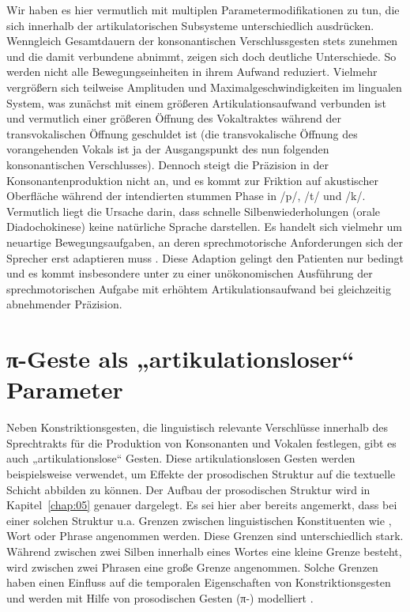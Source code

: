 Wir haben es hier vermutlich mit multiplen Parametermodifikationen zu tun, die sich innerhalb der artikulatorischen Subsysteme unterschiedlich ausdrücken. Wenngleich Gesamtdauern der konsonantischen Verschlussgesten stets zunehmen und die damit verbundene  abnimmt, zeigen sich doch deutliche Unterschiede. So werden nicht alle Bewegungseinheiten in ihrem Aufwand reduziert. Vielmehr vergrößern sich teilweise Amplituden und Maximalgeschwindigkeiten im lingualen System, was zunächst mit einem größeren Artikulationsaufwand verbunden ist und vermutlich einer größeren Öffnung des Vokaltraktes während der transvokalischen Öffnung geschuldet ist (die transvokalische Öffnung des vorangehenden Vokals ist ja der Ausgangspunkt des nun folgenden konsonantischen Verschlusses). Dennoch steigt die Präzision in der Konsonantenproduktion nicht an, und es kommt zur Friktion auf akustischer Oberfläche während der intendierten stummen Phase in /p/, /t/ und /k/. Vermutlich liegt die Ursache darin, dass schnelle Silbenwiederholungen (orale Diadochokinese) keine natürliche Sprache darstellen. Es handelt sich vielmehr um neuartige Bewegungsaufgaben, an deren sprechmotorische Anforderungen sich der Sprecher erst adaptieren muss \citep{Ziegler2002}. Diese Adaption gelingt den Patienten nur bedingt und es kommt insbesondere unter  zu einer unökonomischen Ausführung der sprechmotorischen Aufgabe mit erhöhtem Artikulationsaufwand bei gleichzeitig abnehmender Präzision.

\section{π-Geste als „artikulationsloser“ Parameter}
\label{sec:0403}

Neben Konstriktionsgesten, die linguistisch relevante Verschlüsse innerhalb des Sprechtrakts für die Produktion von Konsonanten und Vokalen festlegen, gibt es auch „artikulationslose“ Gesten. Diese artikulationslosen Gesten werden beispielsweise verwendet, um Effekte der prosodischen Struktur auf die textuelle Schicht abbilden zu können. Der Aufbau der prosodischen Struktur wird in Kapitel~\ref{chap:05} genauer dargelegt. Es sei hier aber bereits angemerkt, dass bei einer solchen Struktur u.a. Grenzen zwischen linguistischen Konstituenten wie , Wort oder Phrase angenommen werden. Diese Grenzen sind unterschiedlich stark. Während zwischen zwei Silben innerhalb eines Wortes eine kleine Grenze besteht, wird zwischen zwei Phrasen eine große Grenze angenommen. Solche Grenzen haben einen Einfluss auf die temporalen Eigenschaften von Konstriktionsgesten und werden mit Hilfe von prosodischen Gesten (π-) modelliert
\citep{Saltzman1999, Byrd2000b, Byrd2003a, Byrd2003b}.

